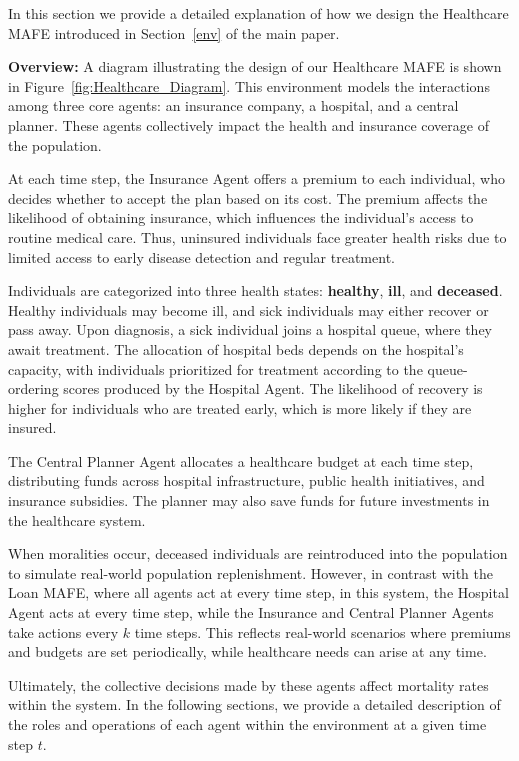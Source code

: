 \label{sec::healthcare_mafe}

In this section we provide a detailed explanation of how we design the Healthcare MAFE introduced in Section~\ref{env} of the main paper.

\textbf{Overview:} A diagram illustrating the design of our Healthcare MAFE is shown in Figure~\ref{fig:Healthcare_Diagram}. This environment models the interactions among three core agents: an insurance company, a hospital, and a central planner. These agents collectively impact the health and insurance coverage of the population.

At each time step, the Insurance Agent offers a premium to each individual, who decides whether to accept the plan based on its cost. The premium affects the likelihood of obtaining insurance, which influences the individual’s access to routine medical care. Thus, uninsured individuals face greater health risks due to limited access to early disease detection and regular treatment.

Individuals are categorized into three health states: \textbf{healthy}, \textbf{ill}, and \textbf{deceased}. Healthy individuals may become ill, and sick individuals may either recover or pass away. Upon diagnosis, a sick individual joins a hospital queue, where they await treatment. The allocation of hospital beds depends on the hospital’s capacity, with individuals prioritized for treatment according to the queue-ordering scores produced by the Hospital Agent. The likelihood of recovery is higher for individuals who are treated early, which is more likely if they are insured.

The Central Planner Agent allocates a healthcare budget at each time step, distributing funds across hospital infrastructure, public health initiatives, and insurance subsidies. The planner may also save funds for future investments in the healthcare system.

When moralities occur, deceased individuals are reintroduced into the population to simulate real-world population replenishment. However, in contrast with the Loan MAFE, where all agents act at every time step, in this system, the Hospital Agent acts at every time step, while the Insurance and Central Planner Agents take actions every $k$ time steps. This reflects real-world scenarios where premiums and budgets are set periodically, while healthcare needs can arise at any time. 

Ultimately, the collective decisions made by these agents affect mortality rates within the system. In the following sections, we provide a detailed description of the roles and operations of each agent within the environment at a given time step $t$.

